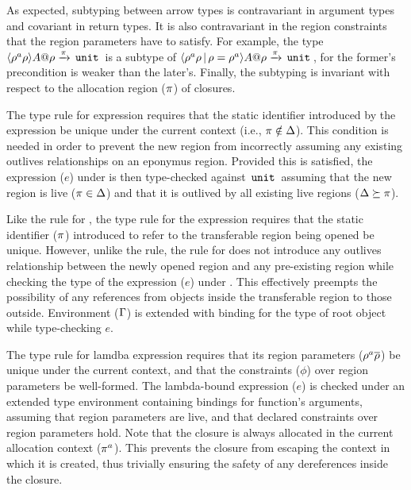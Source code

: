 As expected, subtyping between arrow types is contravariant in
argument types and covariant in return types. It is also contravariant
in the region constraints that the region parameters have to satisfy.
For example, the type $\langle \rho^a\rho \rangle A@\rho \xrightarrow{\pi}
\,{\tt unit}\,$ is a subtype of $\langle \rho^a\rho \,|\, \rho =  \rho^a \rangle
A@\rho \xrightarrow{\pi} \,{\tt unit}\,$, for the former's precondition is
weaker than the later's. Finally, the subtyping is invariant with
respect to the allocation region ($\pi$) of closures. 

The type rule for  expression requires that the static
identifier introduced by the expression be unique under the current
context (i.e., $\pi \notin \Delta$). This condition is needed in
order to prevent the new region from incorrectly assuming any existing
outlives relationships on an eponymus region. Provided this is
satisfied, the expression ($e$) under  is then
type-checked against $\,{\tt unit}\,$ assuming that the new region is live
($\pi \in \Delta$) and that it is outlived by all existing live
regions ($\Delta \succeq \pi$).

Like the rule for , the type rule for the 
expression requires that the static identifier ($\pi$) introduced to
refer to the transferable region being opened be unique. However,
unlike the  rule, the rule for  does not
introduce any outlives relationship between the newly opened region
and any pre-existing region while checking the type of the expression
($e$) under . This effectively preempts the possibility of any
references from objects inside the transferable region to those
outside. Environment ($\Gamma$) is extended with binding for the type of
root object while type-checking $e$. 

The type rule for lamdba expression requires that its region
parameters ($\rho^a\overline{\rho}$) be unique under the current context,
and that the constraints ($\phi$) over region parameters be
well-formed. The lambda-bound expression ($e$) is checked under an
extended type environment containing bindings for function's
arguments, assuming that region parameters are live, and that declared
constraints over region parameters hold. Note that the closure is
always allocated in the current allocation context ($\pi^a$). This
prevents the closure from escaping the context in which it is created,
thus trivially ensuring the safety of any dereferences inside the
closure.


